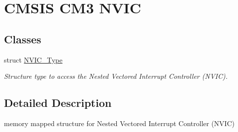 \hypertarget{group___c_m_s_i_s___c_m3___n_v_i_c}{\section{C\-M\-S\-I\-S C\-M3 N\-V\-I\-C}
\label{group___c_m_s_i_s___c_m3___n_v_i_c}
}
\subsection*{Classes}
\begin{DoxyCompactItemize}
\item 
struct \hyperlink{struct_n_v_i_c___type}{N\-V\-I\-C\-\_\-\-Type}
\begin{DoxyCompactList}\small\item\em Structure type to access the Nested Vectored Interrupt Controller (N\-V\-I\-C). \end{DoxyCompactList}\end{DoxyCompactItemize}


\subsection{Detailed Description}
memory mapped structure for Nested Vectored Interrupt Controller (N\-V\-I\-C) 